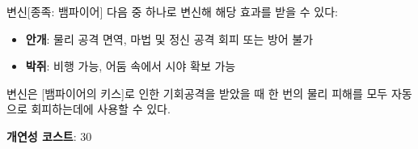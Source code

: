 \documentclass{report}
\begin{document}
	\begin{story}{변신}{[종족: 뱀파이어]}
		다음 중 하나로 변신해 해당 효과를 받을 수 있다:
		\begin{itemize}
			\item \textbf{안개}: 물리 공격 면역, 마법 및 정신 공격 회피 또는 방어 불가
			\item \textbf{박쥐}: 비행 가능, 어둠 속에서 시야 확보 가능
		\end{itemize}
		
		변신은 [뱀파이어의 키스]로 인한 기회공격을 받았을 때 한 번의 물리 피해를 모두 자동으로 회피하는데에 사용할 수 있다.
		
		\smallskip
		
		\textbf{개연성 코스트}: 30
	\end{story}
	
\end{document}
